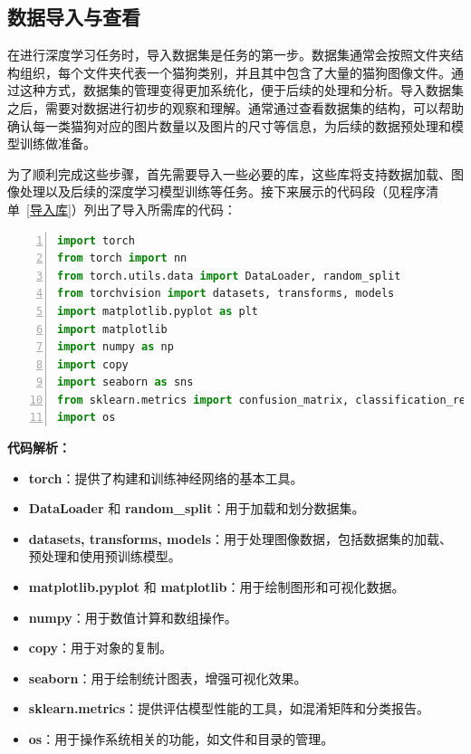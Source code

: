 \subsection{数据导入与查看}
在进行深度学习任务时，导入数据集是任务的第一步。数据集通常会按照文件夹结构组织，每个文件夹代表一个猫狗类别，并且其中包含了大量的猫狗图像文件。通过这种方式，数据集的管理变得更加系统化，便于后续的处理和分析。导入数据集之后，需要对数据进行初步的观察和理解。通常通过查看数据集的结构，可以帮助确认每一类猫狗对应的图片数量以及图片的尺寸等信息，为后续的数据预处理和模型训练做准备。

为了顺利完成这些步骤，首先需要导入一些必要的库，这些库将支持数据加载、图像处理以及后续的深度学习模型训练等任务。接下来展示的代码段（见程序清单~\ref{导入库}）列出了导入所需库的代码：


\begin{lstlisting}[language={python},label={导入库},caption={导入库}, basicstyle=\footnotesize\ttfamily, breaklines=true, numbers=left, frame=single,keepspaces=true,showstringspaces=false]
import torch
from torch import nn
from torch.utils.data import DataLoader, random_split
from torchvision import datasets, transforms, models
import matplotlib.pyplot as plt
import matplotlib
import numpy as np
import copy
import seaborn as sns
from sklearn.metrics import confusion_matrix, classification_report
import os
\end{lstlisting}
\textbf{代码解析：}
\begin{itemize}
    \item \textbf{torch}：提供了构建和训练神经网络的基本工具。
    \item \textbf{DataLoader} 和 \textbf{random\_split}：用于加载和划分数据集。
    \item \textbf{datasets, transforms, models}：用于处理图像数据，包括数据集的加载、预处理和使用预训练模型。
    \item \textbf{matplotlib.pyplot} 和 \textbf{matplotlib}：用于绘制图形和可视化数据。
    \item \textbf{numpy}：用于数值计算和数组操作。
    \item \textbf{copy}：用于对象的复制。
    \item \textbf{seaborn}：用于绘制统计图表，增强可视化效果。
    \item \textbf{sklearn.metrics}：提供评估模型性能的工具，如混淆矩阵和分类报告。
    \item \textbf{os}：用于操作系统相关的功能，如文件和目录的管理。

\end{itemize}

